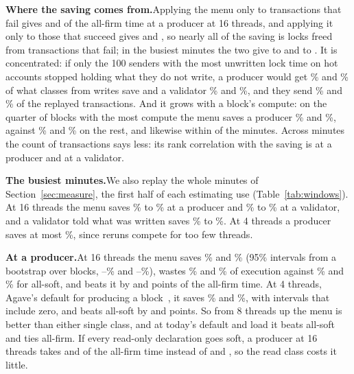 \documentclass[conference,compsoc]{IEEEtran}
\numberwithin{equation}{section}
\theoremstyle{plain}
\theoremstyle{definition}
\theoremstyle{remark}
\newcommand{\runin}[1]{\par\smallskip\noindent\textbf{#1.}\enspace}
\begin{document}


\runin{Where the saving comes from}Applying the menu only to transactions that fail gives \freeFailedOnlyRatioSixteenA{} and \freeFailedOnlyRatioSixteenB{} of the all-firm time at a producer at 16 threads, and applying it only to those that succeed gives \freeOkOnlyRatioSixteenA{} and \freeOkOnlyRatioSixteenB{}, so nearly all of the saving is locks freed from transactions that fail; in the busiest minutes the two give \winFailedOnlyFreeMin{} to \winFailedOnlyFreeMax{} and \winOkOnlyFreeMin{} to \winOkOnlyFreeMax{}. It is concentrated: if only the 100 senders with the most unwritten lock time on hot accounts stopped holding what they do not write, a producer would get \harmTopHundredFreeA\% and \harmTopHundredFreeB\% of what classes from writes save and a validator \harmTopHundredBlockA\% and \harmTopHundredBlockB\%, and they send \topHundredTxA\% and \topHundredTxB\% of the replayed transactions. And it grows with a block's compute: on the quarter of blocks with the most compute the menu saves a producer \freeTopMenuCutSixteenA\% and \freeTopMenuCutSixteenB\%, against \freeRestMenuCutSixteenA\% and \freeRestMenuCutSixteenB\% on the rest, and likewise within \nTopAbove{} of the \nMinutes{} minutes. Across minutes the count of transactions says less: its rank correlation with the saving is \rankTpsFree{} at a producer and \rankTpsBlock{} at a validator.

\runin{The busiest minutes}We also replay the whole minutes of Section~\ref{sec:measure}, the first half of each estimating use (Table~\ref{tab:windows}). At 16 threads the menu saves \winFreeCutSixteenMin\% to \winFreeCutSixteenMax\% at a producer and \winBlockCutSixteenMin\% to \winBlockCutSixteenMax\% at a validator, and a validator told what was written saves \winToldSixteenMin\% to \winToldSixteenMax\%. At 4 threads a producer saves at most \winFreeCutFourMax\%, since reruns compete for too few threads.

\runin{At a producer}At 16 threads the menu saves \freeMenuLoCutSixteenA\% and \freeMenuLoCutSixteenB\% (95\% intervals from a bootstrap over blocks, \freeMenuLoCutCiLoSixteenA--\freeMenuLoCutCiHiSixteenA\% and \freeMenuLoCutCiLoSixteenB--\freeMenuLoCutCiHiSixteenB\%), wastes \freeMenuLoWasteSixteenA\% and \freeMenuLoWasteSixteenB\% of execution against \freeSoftWasteSixteenA\% and \freeSoftWasteSixteenB\% for all-soft, and beats it by \freeLeadSoftSixteenA{} and \freeLeadSoftSixteenB{} points of the all-firm time. At 4 threads, Agave's default for producing a block~\cite{agave}, it saves \freeMenuLoCutFourA\% and \freeMenuLoCutFourB\%, with intervals that include zero, and beats all-soft by \freeLeadSoftFourA{} and \freeLeadSoftFourB{} points. So from 8 threads up the menu is better than either single class, and at today's default and load it beats all-soft and ties all-firm. If every read-only declaration goes soft, a producer at 16 threads takes \softReadFreeRatioSixteenA{} and \softReadFreeRatioSixteenB{} of the all-firm time instead of \freeMenuLoRatioSixteenA{} and \freeMenuLoRatioSixteenB{}, so the read class costs it little.
\end{document}
